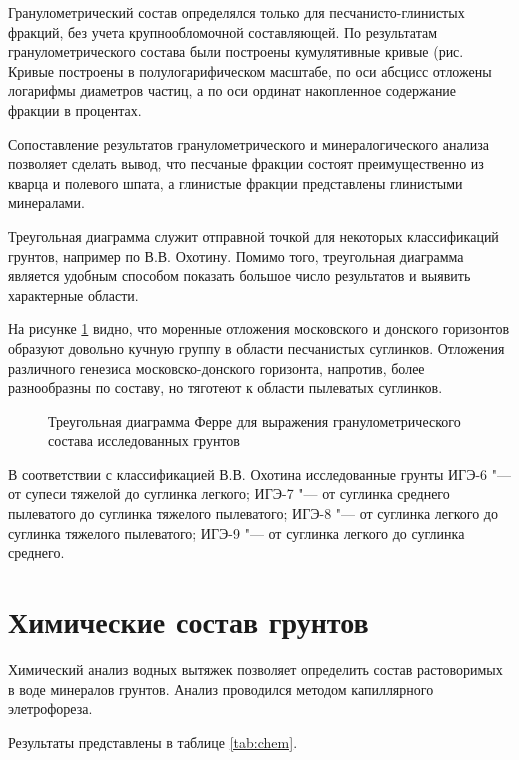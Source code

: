 Гранулометрический состав определялся только для песчанисто-глинистых фракций, без учета крупнообломочной составляющей.
По результатам гранулометрического состава были построены кумулятивные кривые (рис. %
Кривые построены в полулогарифическом масштабе, 
по оси абсцисс отложены логарифмы диаметров частиц, 
а по оси ординат накопленное содержание фракции в процентах.

{
\small

}

Сопоставление результатов гранулометрического и минералогического анализа позволяет сделать вывод, 
что песчаные фракции состоят преимущественно из кварца и полевого шпата, 
а глинистые фракции представлены глинистыми минералами.

Треугольная диаграмма служит отправной точкой для некоторых классификаций грунтов, например по В.\;В. Охотину.
Помимо того, треугольная диаграмма является удобным способом показать большое число результатов и выявить характерные области.

На рисунке \ref{Fig:Ferre} видно, что моренные отложения московского и донского горизонтов образуют довольно кучную группу в области песчанистых суглинков.
Отложения различного генезиса московско-донского горизонта, напротив, более разнообразны по составу, но тяготеют к области 
пылеватых суглинков.

\begin{figure}[ht]
    \centering
    \small
    
    \caption{Треугольная диаграмма Ферре для выражения гранулометрического состава исследованных грунтов}
    \label{Fig:Ferre}
\end{figure}

 В соответствии с классификацией В.\;В. Охотина исследованные грунты 
 ИГЭ-6 "--- от супеси тяжелой до суглинка легкого;
 ИГЭ-7 "--- от суглинка среднего пылеватого до суглинка тяжелого пылеватого;
 ИГЭ-8 "--- от суглинка легкого до суглинка тяжелого пылеватого;
 ИГЭ-9 "--- от суглинка легкого до суглинка среднего.

 
\section{Химические состав грунтов}

Химический анализ водных вытяжек позволяет определить состав растоворимых в воде минералов грунтов.
Анализ проводился методом капиллярного элетрофореза. 

Результаты представлены в таблице \ref{tab:chem}.

